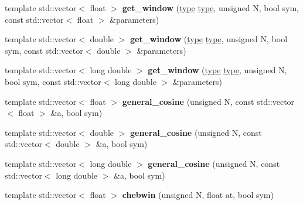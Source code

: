 \begin{DoxyCompactItemize}
\mbox{\label{namespacedsp_1_1window_aff6545256f8895b8057bb6e208090e14}} 
template std\+::vector$<$ float $>$ {\bfseries get\+\_\+window} (\mbox{\hyperlink{namespacedsp_1_1window_a1cc0dcec4aa9e12640771bdf41f695b8}{type}} \mbox{\hyperlink{namespacedsp_1_1window_a1cc0dcec4aa9e12640771bdf41f695b8}{type}}, unsigned N, bool sym, const std\+::vector$<$ float $>$ \&parameters)
\item 
\mbox{\label{namespacedsp_1_1window_a8c2f70354a06f7fe65fd705cb67e50e4}} 
template std\+::vector$<$ double $>$ {\bfseries get\+\_\+window} (\mbox{\hyperlink{namespacedsp_1_1window_a1cc0dcec4aa9e12640771bdf41f695b8}{type}} \mbox{\hyperlink{namespacedsp_1_1window_a1cc0dcec4aa9e12640771bdf41f695b8}{type}}, unsigned N, bool sym, const std\+::vector$<$ double $>$ \&parameters)
\item 
\mbox{\label{namespacedsp_1_1window_a3530d76c69aab27edc0fb335c817831c}} 
template std\+::vector$<$ long double $>$ {\bfseries get\+\_\+window} (\mbox{\hyperlink{namespacedsp_1_1window_a1cc0dcec4aa9e12640771bdf41f695b8}{type}} \mbox{\hyperlink{namespacedsp_1_1window_a1cc0dcec4aa9e12640771bdf41f695b8}{type}}, unsigned N, bool sym, const std\+::vector$<$ long double $>$ \&parameters)
\item 
\mbox{\label{namespacedsp_1_1window_a47acb925f568201e7e815d2a721ac594}} 
template std\+::vector$<$ float $>$ {\bfseries general\+\_\+cosine} (unsigned N, const std\+::vector$<$ float $>$ \&a, bool sym)
\item 
\mbox{\label{namespacedsp_1_1window_a0ac5f92eef456176382f67ccb208c1e2}} 
template std\+::vector$<$ double $>$ {\bfseries general\+\_\+cosine} (unsigned N, const std\+::vector$<$ double $>$ \&a, bool sym)
\item 
\mbox{\label{namespacedsp_1_1window_a2e040b86b93865c3837a1002635bccbe}} 
template std\+::vector$<$ long double $>$ {\bfseries general\+\_\+cosine} (unsigned N, const std\+::vector$<$ long double $>$ \&a, bool sym)
\item 
\mbox{\label{namespacedsp_1_1window_a4374aa3cfac025d1b7f6579137280f1d}} 
template std\+::vector$<$ float $>$ {\bfseries chebwin} (unsigned N, float at, bool sym)

\end{DoxyCompactItemize}
